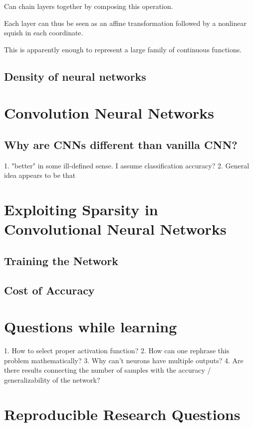 \documentclass[12pt,letterpaper,boxed]{article}
\begin{document}
		Can chain layers together by composing this operation.

		Each layer can thus be seen as an affine transformation followed by a nonlinear squish in each coordinate.

		This is apparently enough to represent a large family of continuous functions.

	\subsection{Density of neural networks}

\section{Convolution Neural Networks}

\subsection{Why are CNNs different than vanilla CNN?}
1. "better" in some ill-defined sense. I assume classification accuracy?
2. General idea appears to be that

\section{Exploiting Sparsity in Convolutional Neural Networks}

	\subsection{Training the Network}

	\subsection{Cost of Accuracy}

\section{Questions while learning}
1. How to select proper activation function?
2. How can one rephrase this problem mathematically?
3. Why can't neurons have multiple outputs?
4. Are there results connecting the number of samples with the accuracy / generalizability of the network?

\section{Reproducible Research Questions}
\end{document}
